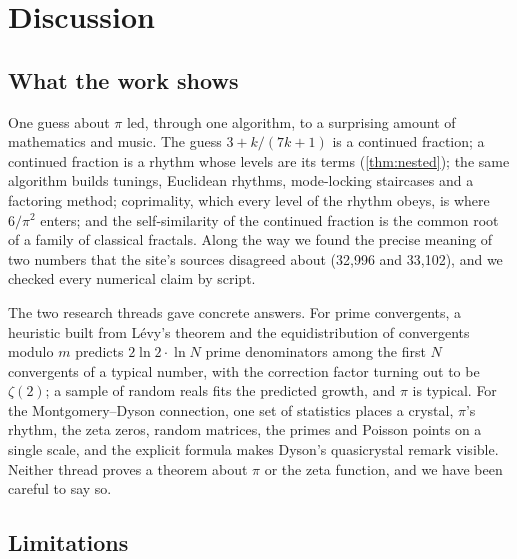 \chapter{Discussion}\label{ch:discussion}

\section{What the work shows}

One guess about $\pi$ led, through one algorithm, to a surprising amount of mathematics and music. The guess $3 + k/(7k+1)$ is a continued fraction; a continued fraction is a rhythm whose levels are its terms (\cref{thm:nested}); the same algorithm builds tunings, Euclidean rhythms, mode-locking staircases and a factoring method; coprimality, which every level of the rhythm obeys, is where $6/\pi^2$ enters; and the self-similarity of the continued fraction is the common root of a family of classical fractals. Along the way we found the precise meaning of two numbers that the site's sources disagreed about (32,996 and 33,102), and we checked every numerical claim by script.

The two research threads gave concrete answers. For prime convergents, a heuristic built from Lévy's theorem and the equidistribution of convergents modulo $m$ predicts $2\ln 2 \cdot \ln N$ prime denominators among the first $N$ convergents of a typical number, with the correction factor turning out to be $\zeta(2)$; a sample of random reals fits the predicted growth, and $\pi$ is typical. For the Montgomery--Dyson connection, one set of statistics places a crystal, $\pi$'s rhythm, the zeta zeros, random matrices, the primes and Poisson points on a single scale, and the explicit formula makes Dyson's quasicrystal remark visible. Neither thread proves a theorem about $\pi$ or the zeta function, and we have been careful to say so.

\section{Limitations}

